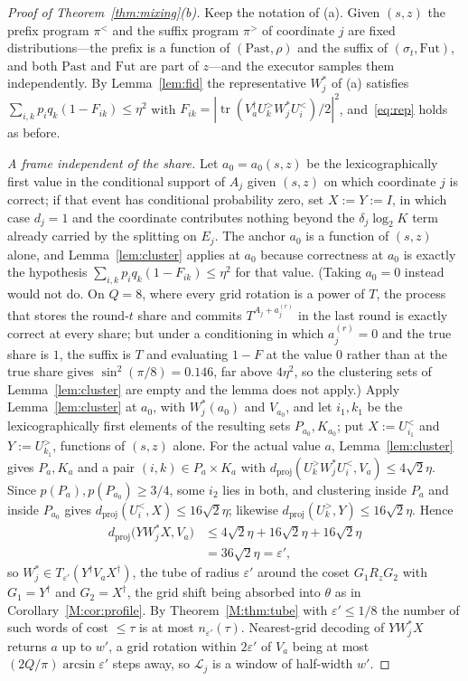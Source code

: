 \documentclass[aps,prx,twocolumn,superscriptaddress,nofootinbib,longbibliography]{revtex4-2}
\theoremstyle{plain}
\theoremstyle{definition}
\theoremstyle{remark}
\newcommand{\dproj}{d_{\mathrm{proj}}}
\newcommand{\tr}{\operatorname{tr}}
\begin{document}
\begin{proof}[Proof of Theorem~\ref{thm:mixing}(b)]
Keep the notation of (a). Given $(s,z)$ the prefix program $\pi^<$ and the suffix program $\pi^>$ of coordinate $j$ are fixed distributions---the prefix is a function of $(\mathrm{Past},\rho)$ and the suffix of $(\sigma_t,\mathrm{Fut})$, and both $\mathrm{Past}$ and $\mathrm{Fut}$ are part of $z$---and the executor samples them independently. By Lemma~\ref{lem:fid} the representative $W^*_j$ of (a) satisfies $\sum_{i,k}p_iq_k(1-F_{ik})\le\eta^2$ with $F_{ik}=|\tr(V_a^\dagger U^>_kW^*_jU^<_i)/2|^2$, and~\eqref{eq:rep} holds as before.

\emph{A frame independent of the share.} Let $a_0=a_0(s,z)$ be the lexicographically first value in the conditional support of $A_j$ given $(s,z)$ on which coordinate $j$ is correct; if that event has conditional probability zero, set $X:=Y:=I$, in which case $d_j=1$ and the coordinate contributes nothing beyond the $\delta_j\log_2K$ term already carried by the splitting on $E_j$. The anchor $a_0$ is a function of $(s,z)$ alone, and Lemma~\ref{lem:cluster} applies at $a_0$ because correctness at $a_0$ is exactly the hypothesis $\sum_{i,k}p_iq_k(1-F_{ik})\le\eta^2$ for that value. (Taking $a_0=0$ instead would not do. On $Q=8$, where every grid rotation is a power of $T$, the process that stores the round-$t$ share and commits $T^{A_j+a^{(r)}_j}$ in the last round is exactly correct at every share; but under a conditioning in which $a^{(r)}_j=0$ and the true share is $1$, the suffix is $T$ and evaluating $1-F$ at the value $0$ rather than at the true share gives $\sin^2(\pi/8)=0.146$, far above $4\eta^2$, so the clustering sets of Lemma~\ref{lem:cluster} are empty and the lemma does not apply.) Apply Lemma~\ref{lem:cluster} at $a_0$, with $W^*_j(a_0)$ and $V_{a_0}$, and let $i_1,k_1$ be the lexicographically first elements of the resulting sets $P_{a_0},K_{a_0}$; put $X:=U^<_{i_1}$ and $Y:=U^>_{k_1}$, functions of $(s,z)$ alone. For the actual value $a$, Lemma~\ref{lem:cluster} gives $P_a,K_a$ and a pair $(i,k)\in P_a\times K_a$ with $\dproj(U^>_kW^*_jU^<_i,V_a)\le4\sqrt2\eta$. Since $p(P_a),p(P_{a_0})\ge3/4$, some $i_2$ lies in both, and clustering inside $P_a$ and inside $P_{a_0}$ gives $\dproj(U^<_i,X)\le16\sqrt2\eta$; likewise $\dproj(U^>_k,Y)\le16\sqrt2\eta$. Hence
\[
\begin{aligned}
\dproj\big(YW^*_jX,V_a\big)&\le4\sqrt2\eta+16\sqrt2\eta+16\sqrt2\eta\\
&=36\sqrt2\eta=\varepsilon',
\end{aligned}
\]
so $W^*_j\in T_{\varepsilon'}(Y^\dagger V_aX^\dagger)$, the tube of radius $\varepsilon'$ around the coset $G_1R_zG_2$ with $G_1=Y^\dagger$ and $G_2=X^\dagger$, the grid shift being absorbed into $\theta$ as in Corollary~\ref{M:cor:profile}. By Theorem~\ref{M:thm:tube} with $\varepsilon'\le1/8$ the number of such words of cost $\le\tau$ is at most $n_{\varepsilon'}(\tau)$. Nearest-grid decoding of $YW^*_jX$ returns $a$ up to $w'$, a grid rotation within $2\varepsilon'$ of $V_a$ being at most $(2Q/\pi)\arcsin\varepsilon'$ steps away, so $\mathcal L_j$ is a window of half-width $w'$.


\end{proof}
\end{document}
